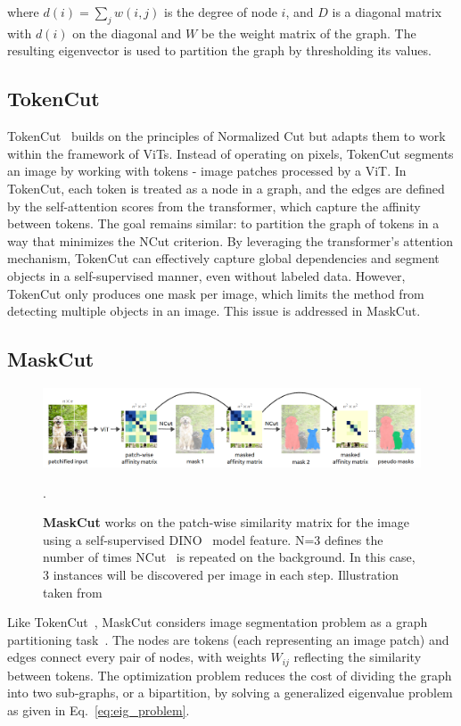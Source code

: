 where \( d(i) = \sum_{j} w(i, j) \) is the degree of node \( i \), and \( D \) is a diagonal matrix with \( d(i) \) on the diagonal and \( W \) be the weight matrix of the graph. The resulting eigenvector is used to partition the graph by thresholding its values.

\subsection{TokenCut}
TokenCut~\cite{wang2022tokencut} builds on the principles of Normalized Cut but adapts them to work within the framework of ViTs. Instead of operating on pixels, TokenCut segments an image by working with tokens - image patches processed by a ViT. In TokenCut, each token is treated as a node in a graph, and the edges are defined by the self-attention scores from the transformer, which capture the affinity between tokens. The goal remains similar: to partition the graph of tokens in a way that minimizes the NCut criterion. By leveraging the transformer’s attention mechanism, TokenCut can effectively capture global dependencies and segment objects in a self-supervised manner, even without labeled data. However, TokenCut only produces one mask per image, which limits the method from detecting multiple objects in an image. This issue is addressed in MaskCut.

\subsection{MaskCut}
\begin{figure}
	\centering
	\includegraphics[width=1.0\textwidth]{Images/main/maskcut_eg.png}
	\caption[\textbf{MaskCut Flow}]{\textbf{MaskCut} works on the patch-wise
		similarity matrix for the image using a self-supervised DINO~\cite{caron2021emerging} model feature. N=3 defines the number of times NCut~\cite{normcut} is repeated on the background. In this case, 3 instances will be discovered per image in each step. Illustration taken from~\cite{wang2023cut}}.
	\label{fig:maskcut_flow}
\end{figure}

Like TokenCut~\cite{wang2022tokencut}, MaskCut considers image segmentation problem as a graph partitioning task~\cite{normcut}. The nodes are tokens (each representing an image patch) and edges connect every pair of nodes, with weights \(W_{ij}\) reflecting the similarity between tokens. The optimization problem reduces the cost of dividing the graph into two sub-graphs, or a bipartition, by solving a generalized eigenvalue problem as given in Eq.~\ref{eq:eig_problem}. 

